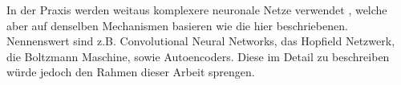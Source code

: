 \documentclass{thesisclass}
\begin{document}
In der Praxis werden weitaus komplexere neuronale Netze verwendet  \cite{dellaert1996recognizing}, welche aber auf denselben Mechanismen basieren wie die hier beschriebenen. Nennenswert sind z.B. Convolutional Neural Networks, das Hopfield Netzwerk, die Boltzmann Maschine, sowie Autoencoders. Diese im Detail zu beschreiben würde jedoch den Rahmen dieser Arbeit sprengen.




\end{document}

